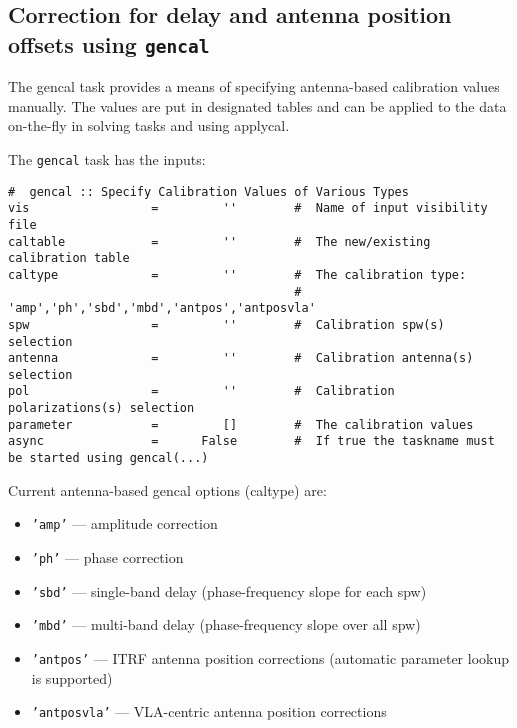 \subsection{Correction for delay and antenna position offsets 
   using {\tt gencal}}
\label{section:cal.prior.gencal}


The gencal task provides a means of specifying antenna-based
calibration values manually.  The values are put in designated tables
and can be applied to the data on-the-fly in solving tasks and 
using applycal.

The {\tt gencal} task has the inputs:
\small
\begin{verbatim}
#  gencal :: Specify Calibration Values of Various Types
vis                 =         ''        #  Name of input visibility file
caltable            =         ''        #  The new/existing calibration table
caltype             =         ''        #  The calibration type:
                                        #   'amp','ph','sbd','mbd','antpos','antposvla'
spw                 =         ''        #  Calibration spw(s) selection
antenna             =         ''        #  Calibration antenna(s) selection
pol                 =         ''        #  Calibration polarizations(s) selection
parameter           =         []        #  The calibration values
async               =      False        #  If true the taskname must be started using gencal(...)
\end{verbatim}
\normalsize


Current antenna-based gencal options (caltype) are:
\begin{itemize}
   \item {\tt 'amp'} --- amplitude correction
   \item {\tt 'ph'} --- phase correction
   \item {\tt 'sbd'} --- single-band delay (phase-frequency slope for each spw)
   \item {\tt 'mbd'} --- multi-band delay (phase-frequency slope over all spw)
   \item {\tt 'antpos'} --- ITRF antenna position corrections
     (automatic parameter lookup is supported)
   \item {\tt 'antposvla'} --- VLA-centric antenna position corrections 
\end{itemize}


